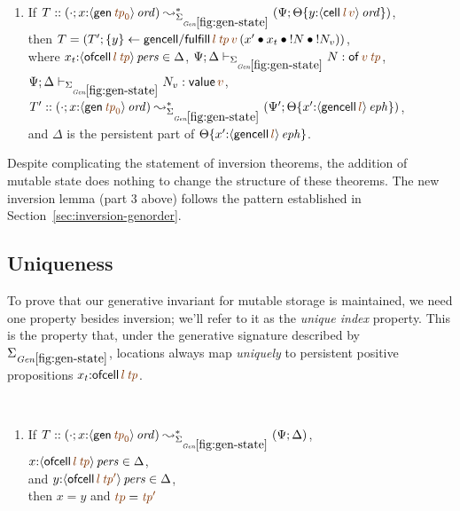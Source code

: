 \begin{lemma}
\begin{enumerate}
\medskip
\item If $T :: (\cdot; x{:}\istrue{\susp{{\sf gen}\,\lf{{\it tp}_0}}})
         \leadsto^*_{\siggenstate} 
         (\Psi; \tackon{\Theta}
            {y{:}\istrue{\susp{{\sf cell}\,\lf{{\it l}}\,\lf{v}}}})$,
\\ then $T = (T'; \trstep{y}{{\sf gencell/fulfill}\,\lf{l}\,\lf{\it tp}\,\lf{v}\,(\tfuser{x'}{\tfuser{x_t}{\tfuser{\tbangr{N}}{\tbangr{N_v}}}})})$,
\\ where $x_t{:}\ispers{\susp{{\sf ofcell}\,\lf{l}\,\lf{\it tp}}} \in \Delta$,
   $\Psi; \Delta \vdash_{\siggenstate} N : {\sf of}\,\lf{v}\,\lf{\it tp}$,
   $\Psi; \Delta \vdash_{\siggenstate} N_v : {\sf value}\,\lf{v}$,
\\ $T' :: (\cdot; x{:}\istrue{\susp{{\sf gen}\,\lf{{\it tp}_0}}})
       \leadsto^*_{\siggenstate}
       (\Psi'; \tackon{\Theta}
          {x'{:}\iseph{\susp{{\sf gencell}\,\lf{l}}}})$,
\\ and $\Delta$ is the persistent part of 
   $\tackon{\Theta}
          {x'{:}\iseph{\susp{{\sf gencell}\,\lf{l}}}}$.
\end{enumerate}
\end{lemma}
\bigskip

Despite complicating the statement of inversion theorems, the addition
of mutable state does nothing to change the structure 
of these theorems.
The new inversion lemma (part 3 above) follows the
pattern established in Section~\ref{sec:inversion-genorder}.

\subsection{Uniqueness}

To prove that our generative invariant for mutable storage is
maintained, we need one property besides inversion; we'll refer to it
as the {\it unique index} property. This is the property that, under
the generative signature described by $\siggenstate$, locations always
map {\it uniquely} to persistent positive propositions $x_t{:}{\sf
  ofcell}\,\lf{l}\,\lf{\it tp}$.

\bigskip
\begin{lemma}~
\begin{enumerate}
\item
If $T :: (\cdot; x{:}\istrue{\susp{{\sf gen}\,\lf{{\it tp}_0}}})
         \leadsto^*_{\siggenstate}
         (\Psi; \Delta)$,
\\ ${x}{:}\ispers{\susp{{\sf ofcell}\,\lf{l}\,\lf{\it tp}}} \in \Delta$, 
\\ and 
${y}{:}\ispers{\susp{{\sf ofcell}\,\lf{l}\,\lf{{\it tp}'}}} \in \Delta$, 
\\ then $x = y$ and $\lf{tp} = \lf{{\it tp}'}$
\end{enumerate}
\end{lemma}

